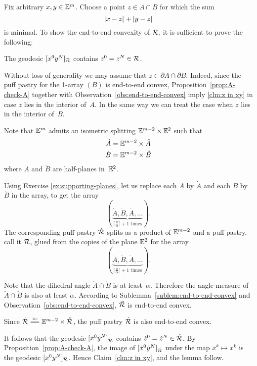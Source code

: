 Fix arbitrary $x,y\in \mathbb{E}^m$.
Choose a point $z\in A\cap B$
for which the sum 
\[\dist{x}{z}{}+\dist{y}{z}{}\] 
is minimal.
To show the end-to-end convexity of  $\mathcal{R}$,
it is sufficient to prove the following:

\begin{clm}{}\label{clm:z in xy}
The geodesic $[x^0y^N]_{\mathcal{R}}$ contains $z^0=z^N\in \mathcal{R}$.
\end{clm}

Without loss of generality we may assume that $z\in\partial A\cap\partial B$.
Indeed, since the puff pastry for the 1-array $(B)$ is end-to-end convex,
Proposition~\ref{prop:A-check-A} together with Observation~\ref{obs:end-to-end-convex}
imply \ref{clm:z in xy} in  case $z$ lies in the interior of~$A$.
In the same way we can treat the case when $z$ lies in the interior of~$B$.

Note that $\mathbb{E}^{m}$ admits 
an
isometric splitting $\mathbb{E}^{m-2}\times \mathbb{E}^2$ 
such that 
\begin{align*}
\dot A&=\mathbb{E}^{m-2}\times \ddot A
\\
\dot B&=\mathbb{E}^{m-2}\times \ddot B
\end{align*}
where $\ddot A$ and $\ddot B$ are half-planes in~$\mathbb{E}^2$.

Using Exercise \ref{ex:supporting-planes}, let us replace each $A$ by $\dot A$ and each $B$ by $\dot B$
in the array, to get the array
\[(\underbrace{\dot A,\dot B,\dot A,\dots}_{\text{$\lceil\tfrac\pi\alpha\rceil+1$ times}}).\]
The corresponding puff pastry $\dot{\mathcal{R}}$
splits as a product of $\mathbb{E}^{m-2}$ and a puff pastry, 
call it $\ddot{\mathcal{R}}$,
glued from the copies of the plane $\mathbb{E}^2$ for the array
\[(\underbrace{\ddot A,\ddot B,\ddot A,\dots}_{\text{$\lceil\tfrac\pi\alpha\rceil+1$ times}}).\]

Note that the dihedral angle $\dot A\cap \dot B$ is at least~$\alpha$.
Therefore the angle measure of  $\ddot A\cap \ddot B$ is also at least $\alpha$.
According to Sublemma~\ref{sublem:end-to-end-convex} and Observation~\ref{obs:end-to-end-convex}, $\ddot{\mathcal{R}}$ is end-to-end convex.

Since $\dot{\spc{R}}\iso\EE^{m-2}\times\ddot{\spc{R}}$, 
the puff pastry $\dot{\mathcal{R}}$ is also end-to-end convex.

It follows that the geodesic $[\dot x^0\dot y^N]_{\dot{\mathcal{R}}}$ contains $\dot z^0=\dot z^N\in\dot{\mathcal{R}}$.
By Proposition~\ref{prop:A-check-A}, 
the image of $[\dot x^0\dot y^N]_{\dot{\mathcal{R}}}$ 
under the map $\dot x^k\mapsto x^k$
is the geodesic $[x^0 y^N]_{\mathcal{R}}$.
Hence Claim~\ref{clm:z in xy}, 
and the lemma follow.
\qeds

